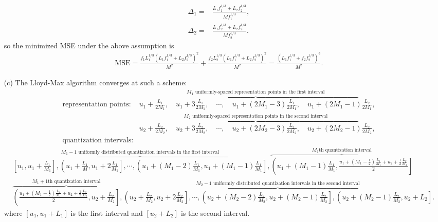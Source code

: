 \documentclass{assignment}
\begin{document}
\begin{sol}
\begin{itemize}
\begin{align}
            \Delta_1=&\frac{L_1f_1^{1/3}+L_2f_2^{1/3}}{Mf_1^{1/3}},\\
            \Delta_2=&\frac{L_1f_2^{1/3}+L_2f_2^{1/3}}{Mf_2^{1/3}}.
        \end{align}
        so the minimized MSE under the above assumption is
        \begin{align}
            \text{MSE}=\frac{f_1L_1^{1/3}(L_1f_1^{1/3}+L_2f_2^{1/3})^2}{M^2}+\frac{f_2L_2^{1/3}(L_1f_1^{1/3}+L_2f_2^{1/3})^2}{M^2}=\frac{(L_1f_1^{1/3}+f_2f_2^{1/3})^3}{M^2}.
        \end{align}
        \item[(c)] The Lloyd-Max algorithm converges at such a scheme:
        \begin{align*}
            \text{representation points}:&\overbrace{u_1+\frac{L_1}{2M_1},\quad u_1+3\frac{L_1}{2M_1},\quad\cdots,\quad u_1+(2M_1-3)\frac{L_1}{2M_1},\quad u_1+(2M_1-1)\frac{L_2}{2M_1}}^{M_1 \text{ uniformly-spaced representation points in the first interval}},\\
            &\overbrace{u_2+\frac{L_2}{2M_2},\quad u_2+3\frac{L_2}{2M_2},\quad\cdots,\quad u_2+(2M_2-3)\frac{L_2}{2M_2},\quad u_2+(2M_2-1)\frac{L_2}{2M_2}}^{M_2 \text{ uniformly-spaced representation points in the second interval}},\\
            \text{quantization intervals}:&
        \end{align*}
        {\scriptsize
        \begin{align*}
            &\overbrace{\left[u_1,u_1+\frac{L_1}{M_1}\right],\left(u_1+\frac{L_1}{M},u_1+2\frac{L_1}{M_1}\right],\cdots,\left(u_1+(M_1-2)\frac{L_1}{M_1},u_1+(M_1-1)\frac{L_1}{M_1}\right]}^{M_1-1\text{ uniformly distributed quantization intervals in the first interval}},\overbrace{\left(u_1+(M_1-1)\frac{L_1}{M_1},\frac{u_1+(M_1-\frac{1}{2})\frac{L_1}{M_1}+u_2+\frac{1}{2}\frac{L_2}{M_2}}{2}\right]}^{M_1\text{th quantization interval}}\\
            &\overbrace{\left(\frac{u_1+(M_1-\frac{1}{2})\frac{L_1}{M_1}+u_2+\frac{1}{2}\frac{L_2}{M_2}}{2},u_2+\frac{L_2}{M_2}\right]}^{M_1+1\text{th quantization interval}},\overbrace{\left(u_2+\frac{L_2}{M_2},u_2+2\frac{L_2}{M_2}\right],\cdots,\left(u_2+(M_2-2)\frac{L_2}{M_2},u_2+(M_2-1)\frac{L_2}{M_2}\right],\left(u_2+(M_2-1)\frac{L_2}{M_2},u_2+L_2\right]}^{M_2-1\text{ uniformly distributed quantization intervals in the second interval}}.
        \end{align*}
        }%
        where $[u_1,u_1+L_1]$ is the first interval and $[u_2+L_2]$ is the second interval.\\

\end{itemize}
\end{sol}
\end{document}
